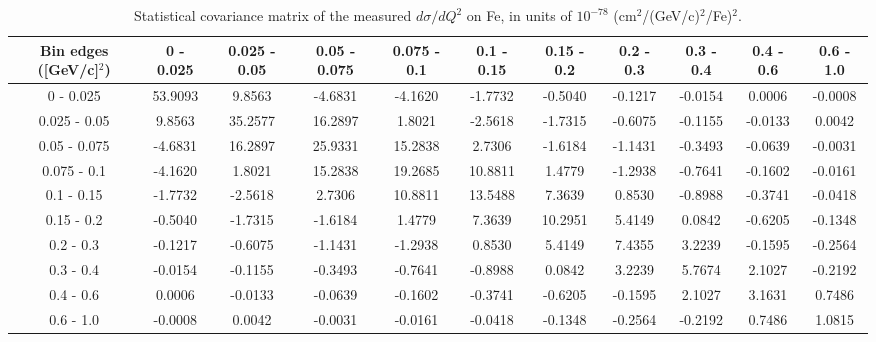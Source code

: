 \documentclass[aps,prl,twocolumn,superscriptaddress,nofootinbib]{revtex4-1}
\begin{document}
\begin{table}[h!]
  \centering
  \caption{Statistical covariance matrix of the measured $d\sigma/dQ^{2}$ on Fe, in units of $10^{-78}$ (cm$^{2}$/(GeV/c)$^{2}$/Fe)$^{2}$.}
    \begin{tabular}{c||cccccccccc}
      Bin edges ([GeV/c]$^{2}$) & 0 - 0.025 & 0.025 - 0.05 & 0.05 - 0.075 & 0.075 - 0.1 & 0.1 - 0.15 & 0.15 - 0.2 & 0.2 - 0.3 & 0.3 - 0.4 & 0.4 - 0.6 & 0.6 - 1.0 \\
\hline \hline
         0 - 0.025 & 53.9093 &  9.8563 & -4.6831 & -4.1620 & -1.7732 & -0.5040 & -0.1217 & -0.0154 &  0.0006 & -0.0008 \\
      0.025 - 0.05 &  9.8563 & 35.2577 & 16.2897 &  1.8021 & -2.5618 & -1.7315 & -0.6075 & -0.1155 & -0.0133 &  0.0042 \\
      0.05 - 0.075 & -4.6831 & 16.2897 & 25.9331 & 15.2838 &  2.7306 & -1.6184 & -1.1431 & -0.3493 & -0.0639 & -0.0031 \\
       0.075 - 0.1 & -4.1620 &  1.8021 & 15.2838 & 19.2685 & 10.8811 &  1.4779 & -1.2938 & -0.7641 & -0.1602 & -0.0161 \\
        0.1 - 0.15 & -1.7732 & -2.5618 &  2.7306 & 10.8811 & 13.5488 &  7.3639 &  0.8530 & -0.8988 & -0.3741 & -0.0418 \\
        0.15 - 0.2 & -0.5040 & -1.7315 & -1.6184 &  1.4779 &  7.3639 & 10.2951 &  5.4149 &  0.0842 & -0.6205 & -0.1348 \\
         0.2 - 0.3 & -0.1217 & -0.6075 & -1.1431 & -1.2938 &  0.8530 &  5.4149 &  7.4355 &  3.2239 & -0.1595 & -0.2564 \\
         0.3 - 0.4 & -0.0154 & -0.1155 & -0.3493 & -0.7641 & -0.8988 &  0.0842 &  3.2239 &  5.7674 &  2.1027 & -0.2192 \\
         0.4 - 0.6 &  0.0006 & -0.0133 & -0.0639 & -0.1602 & -0.3741 & -0.6205 & -0.1595 &  2.1027 &  3.1631 &  0.7486 \\
         0.6 - 1.0 & -0.0008 &  0.0042 & -0.0031 & -0.0161 & -0.0418 & -0.1348 & -0.2564 & -0.2192 &  0.7486 &  1.0815 \\
    \end{tabular}
  \label{tablecov:Fe_Statistical_Q2}
\end{table}
\end{document}
